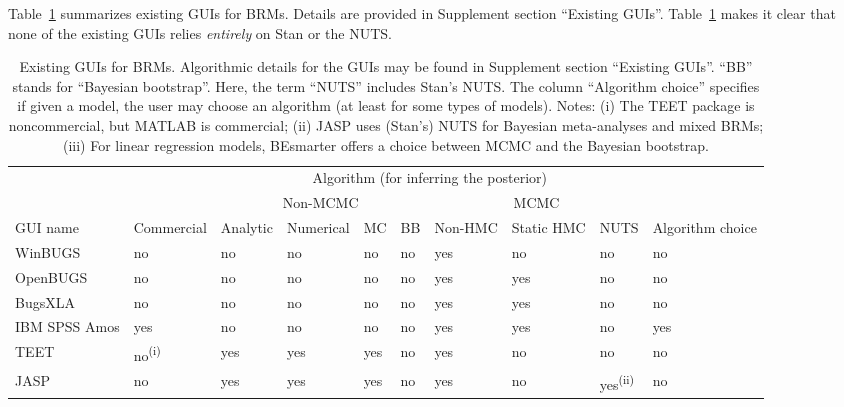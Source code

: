 Table~\ref{tab:GUIs} summarizes existing GUIs for BRMs. Details are provided
in Supplement section ``Existing GUIs''.
Table~\ref{tab:GUIs} makes it clear that none of the existing GUIs relies
\emph{entirely} on Stan or the NUTS.
\begin{table}
  \centering
  \caption{Existing GUIs for BRMs. Algorithmic details for the GUIs may be found in Supplement section ``Existing GUIs''. ``BB'' stands for ``Bayesian bootstrap''. Here, the term ``NUTS'' includes Stan's NUTS. The column ``Algorithm choice'' specifies if given a model, the user may choose an algorithm (at least for some types of models). Notes: (i) The TEET package is noncommercial, but MATLAB is commercial; (ii) JASP uses (Stan's) NUTS for Bayesian meta-analyses and mixed BRMs; (iii) For linear regression models, BEsmarter offers a choice between MCMC and the Bayesian bootstrap.}
  \label{tab:GUIs}
  \begin{tabular}{ll|llll|lll|l}
    \toprule
    & & \multicolumn{7}{c|}{Algorithm (for inferring the posterior)} & \\
    & & \multicolumn{4}{c|}{Non-MCMC} & \multicolumn{3}{c|}{MCMC} & \\
    GUI name & Commercial & Analytic & Numerical & MC & BB & Non-HMC & Static HMC & NUTS & Algorithm choice \\
    \midrule
    WinBUGS \citep{lunn_winbugs_2000} & {\color{dgray}no} & {\color{dgray}no} & {\color{dgray}no} & {\color{dgray}no} & {\color{dgray}no} & yes & {\color{dgray}no} & {\color{dgray}no} & {\color{dgray}no} \\
    OpenBUGS \citep{spiegelhalter_openbugs_2014} & {\color{dgray}no} & {\color{dgray}no} & {\color{dgray}no} & {\color{dgray}no} & {\color{dgray}no} & yes & yes & {\color{dgray}no} & {\color{dgray}no} \\
    BugsXLA \citep{woodward_bayesian_2011} & {\color{dgray}no} & {\color{dgray}no} & {\color{dgray}no} & {\color{dgray}no} & {\color{dgray}no} & yes & yes & {\color{dgray}no} & {\color{dgray}no} \\
    IBM SPSS Amos \citep{arbuckle_amos_2020} & yes & {\color{dgray}no} & {\color{dgray}no} & {\color{dgray}no} & {\color{dgray}no} & yes & yes & {\color{dgray}no} & yes \\
    TEET \citep{qian_toolkit_2011} & {\color{dgray}no\textsuperscript{(i)}} & yes & yes & yes & {\color{dgray}no} & yes & {\color{dgray}no} & {\color{dgray}no} & {\color{dgray}no} \\
    JASP \citep{jasp_team_jasp_2020} & {\color{dgray}no} & yes & yes & yes & {\color{dgray}no} & yes & {\color{dgray}no} & yes\textsuperscript{(ii)} & {\color{dgray}no} \\

\end{tabular}
\end{table}

